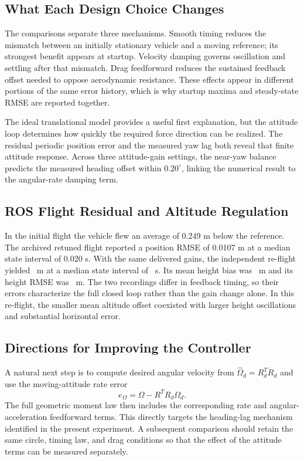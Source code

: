 \documentclass[letterpaper,10pt,conference]{ieeeconf}
\begin{document}
\subsection{What Each Design Choice Changes}
The comparisons separate three mechanisms. Smooth timing reduces the mismatch between an initially stationary vehicle and a moving reference; its strongest benefit appears at startup. Velocity damping governs oscillation and settling after that mismatch. Drag feedforward reduces the sustained feedback offset needed to oppose aerodynamic resistance. These effects appear in different portions of the same error history, which is why startup maxima and steady-state RMSE are reported together.

The ideal translational model provides a useful first explanation, but the attitude loop determines how quickly the required force direction can be realized. The residual periodic position error and the measured yaw lag both reveal that finite attitude response. Across three attitude-gain settings, the near-yaw balance predicts the measured heading offset within $0.20^\circ$, linking the numerical result to the angular-rate damping term.

\subsection{ROS Flight Residual and Altitude Regulation}
In the initial flight the vehicle flew an average of 0.249 m below the reference. The archived retuned flight reported a position RMSE of 0.0107 m at a median state interval of 0.020 s. With the same delivered gains, the independent re-flight yielded \FlightPos\ m at a median state interval of \FlightDt\ s. Its mean height bias was \FlightBias\ m and its height RMSE was \FlightHeight\ m. The two recordings differ in feedback timing, so their errors characterize the full closed loop rather than the gain change alone. In this re-flight, the smaller mean altitude offset coexisted with larger height oscillations and substantial horizontal error.

\subsection{Directions for Improving the Controller}
A natural next step is to compute desired angular velocity from $\widehat\Omega_d=R_d^T\dot R_d$ and use the moving-attitude rate error
\begin{equation}
e_\Omega=\Omega-R^TR_d\Omega_d.
\end{equation}
The full geometric moment law then includes the corresponding rate and angular-acceleration feedforward terms\cite{lee}. This directly targets the heading-lag mechanism identified in the present experiment. A subsequent comparison should retain the same circle, timing law, and drag conditions so that the effect of the attitude terms can be measured separately.
\end{document}
